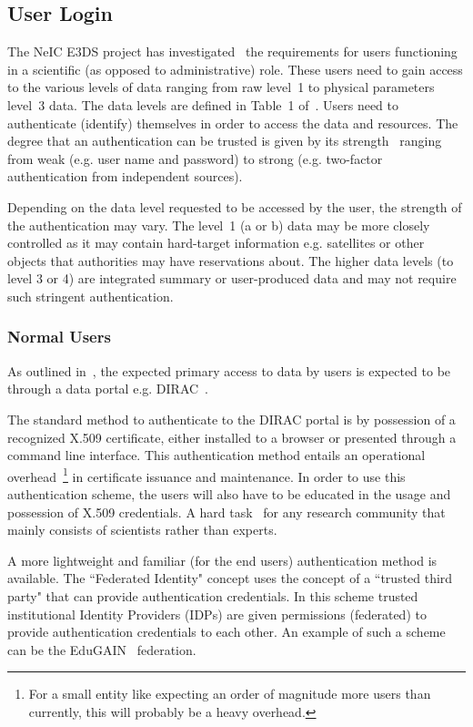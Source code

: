 \documentclass[12pt,a4paper]{article}
\begin{document}
\subsection{User Login}
\label{sec:users}

The NeIC E3DS project has investigated~\cite{e3ds-md3}
the requirements for users functioning in a scientific (as opposed to administrative) role.
These users need to gain access to the various levels of \ED data ranging from raw level~1 to physical parameters level~3 data.
The \ED data levels are defined in Table~1 of~\cite{e3ds-md3}.
Users need to authenticate (identify) themselves in order to access the data and \einfra resources.
The degree that an authentication can be trusted is given by its strength~\cite{owasp-aai} ranging from weak (e.g. user name and password) to strong (e.g. two-factor authentication from independent sources).

Depending on the data level requested to be accessed by the \ED user, the strength of the authentication may vary.
The level~1 (a or b) data may be more closely controlled as it may contain hard-target information e.g. satellites or other objects that authorities may have reservations about.
The higher data levels (to level 3 or 4) are integrated summary or user-produced data and may not require such stringent authentication.

\subsubsection{Normal Users}
\label{ssec:normal}

As outlined in~\cite{e3ds-md3}, the expected primary access to \ED data by users is expected to be through a data portal e.g. DIRAC~\cite{dirac}.

The standard method to authenticate to the DIRAC portal is by possession of a recognized X.509 certificate, either installed to a browser or presented through a command line interface.
This authentication method entails an operational overhead~\footnote{For a small entity like \EC expecting an order of magnitude more users than currently, this will probably be a heavy overhead.} in certificate issuance and maintenance.
In order to use this authentication scheme, the \ED users will also have to be educated in the usage and possession of X.509 credentials.
A hard task~\cite{cert-example} for any research community that mainly consists of scientists rather than \einfra experts.

A more lightweight and familiar (for the end users) authentication method is available.
The ``Federated Identity" concept uses the concept of a ``trusted third party" that can provide authentication credentials.
In this scheme trusted institutional Identity Providers (IDPs) are given permissions (federated) to provide authentication credentials to each other. 
An example of such a scheme can be the EduGAIN~\cite{edugain} federation.
\end{document}
